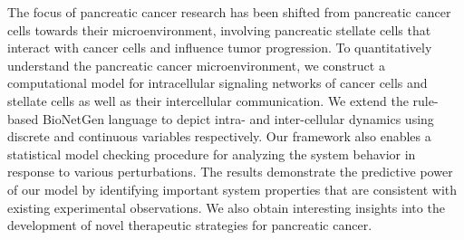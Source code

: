 The focus of pancreatic cancer research has been shifted from pancreatic cancer cells towards their microenvironment, involving pancreatic stellate cells that interact with cancer cells and influence tumor progression. To quantitatively understand the pancreatic cancer microenvironment, we construct a computational model for intracellular signaling networks of cancer cells and stellate cells as well as their intercellular communication. We extend the rule-based BioNetGen language to depict intra- and inter-cellular dynamics using discrete and continuous variables respectively. Our framework also enables a statistical model checking procedure for analyzing the system behavior in response to various perturbations. The results demonstrate the predictive power of our model by identifying important system properties that are consistent with existing experimental observations. We also obtain interesting insights into the development of novel therapeutic strategies for pancreatic cancer.   